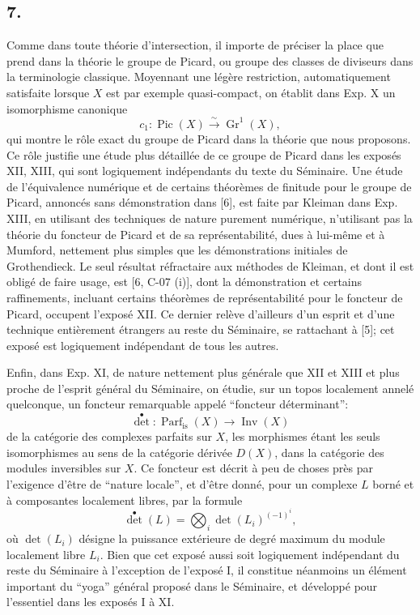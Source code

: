 \documentclass[11pt]{article}
\newcommand{\Gr}{\operatorname{Gr}}
\newcommand{\Parf}{\operatorname{Parf}}
\providecommand{\Inv}{\operatorname{Inv}}
\providecommand{\Pic}{\operatorname{Pic}}
\providecommand{\Gr}{\operatorname{Gr}}
\providecommand{\Gr}{\operatorname{G}}
\begin{document}
\subsection*{7.}
Comme dans toute th\'eorie d'intersection, il importe de pr\'eciser la place que prend dans la th\'eorie le groupe de Picard, ou groupe des classes de diviseurs dans la terminologie classique. Moyennant une l\'eg\`ere restriction, automatiquement satisfaite lorsque $X$ est par exemple quasi-compact, on \'etablit dans Exp. X un isomorphisme canonique
\begin{equation}\tag{7.1}
c_1:\Pic(X)\xrightarrow{\sim}\Gr^1(X),
\end{equation}
qui montre le r\^ole exact du groupe de Picard dans la th\'eorie que nous proposons. Ce r\^ole justifie une \'etude plus d\'etaill\'ee de ce groupe de Picard dans les expos\'es XII, XIII, qui sont logiquement ind\'ependants du texte du S\'eminaire. Une \'etude de l'\'equivalence num\'erique et de certains th\'eor\`emes de finitude pour le groupe de Picard, annonc\'es sans d\'emonstration dans [6], est faite par Kleiman dans Exp. XIII, en utilisant des techniques de nature purement num\'erique, n'utilisant pas la th\'eorie du foncteur de Picard et de sa repr\'esentabilit\'e, dues \`a lui-m\^eme et \`a Mumford, nettement plus simples que les d\'emonstrations initiales de Grothendieck. Le seul r\'esultat r\'efractaire aux m\'ethodes de Kleiman, et dont il est oblig\'e de faire usage, est [6, C-07 (i)], dont la d\'emonstration et certains raffinements, incluant certains th\'eor\`emes de repr\'esentabilit\'e pour le foncteur de Picard, occupent l'expos\'e XII. Ce dernier rel\`eve d'ailleurs d'un esprit et d'une technique enti\`erement \'etrangers au reste du S\'eminaire, se rattachant \`a [5]; cet expos\'e est logiquement ind\'ependant de tous les autres.

Enfin, dans Exp. XI, de nature nettement plus g\'en\'erale que XII et XIII et plus proche de l'esprit g\'en\'eral du S\'eminaire, on \'etudie, sur un topos localement annel\'e quelconque, un foncteur remarquable appel\'e ``foncteur d\'eterminant'':
\begin{equation}\tag{7.2}
\det^\bullet:\Parf_{\mathrm{is}}(X)\longrightarrow \Inv(X)
\end{equation}
de la cat\'egorie des complexes parfaits sur $X$, les morphismes \'etant les seuls isomorphismes au sens de la cat\'egorie d\'eriv\'ee $D(X)$, dans la cat\'egorie des modules inversibles sur $X$. Ce foncteur est d\'ecrit \`a peu de choses pr\`es par l'exigence d'\^etre de ``nature locale'', et d'\^etre donn\'e, pour un complexe $L$ born\'e et \`a composantes localement libres, par la formule
\begin{equation}\tag{7.3}
\det^\bullet(L)=\bigotimes_i \det(L_i)^{(-1)^i},
\end{equation}
o\`u $\det(L_i)$ d\'esigne la puissance ext\'erieure de degr\'e maximum du module localement libre $L_i$. Bien que cet expos\'e aussi soit logiquement ind\'ependant du reste du S\'eminaire \`a l'exception de l'expos\'e I, il constitue n\'eanmoins un \'el\'ement important du ``yoga'' g\'en\'eral propos\'e dans le S\'eminaire, et d\'evelopp\'e pour l'essentiel dans les expos\'es I \`a XI.
\end{document}
